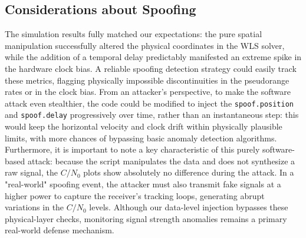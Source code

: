 \subsection{Considerations about Spoofing}
The simulation results fully matched our expectations: the pure spatial manipulation successfully altered the physical coordinates in the WLS solver, while the addition of a temporal delay predictably manifested an extreme spike in the hardware clock bias. A reliable spoofing detection strategy could easily track these metrics, flagging physically impossible discontinuities in the pseudorange rates or in the clock bias. From an attacker's perspective, to make the software attack even stealthier, the code could be modified to inject the \texttt{spoof.position} and \texttt{spoof.delay} progressively over time, rather than an instantaneous step: this would keep the horizontal velocity and clock drift within physically plausible limits, with more chances of bypassing basic anomaly detection algorithms.
Furthermore, it is important to note a key characteristic of this purely software-based attack: because the script manipulates the data and does not synthesize a raw signal, the $C/N_0$ plots show absolutely no difference during the attack. In a "real-world" spoofing event, the attacker must also transmit fake signals at a higher power to capture the receiver's tracking loops, generating abrupt variations in the $C/N_0$ levels. Although our data-level injection bypasses these physical-layer checks, monitoring signal strength anomalies remains a primary real-world defense mechanism.